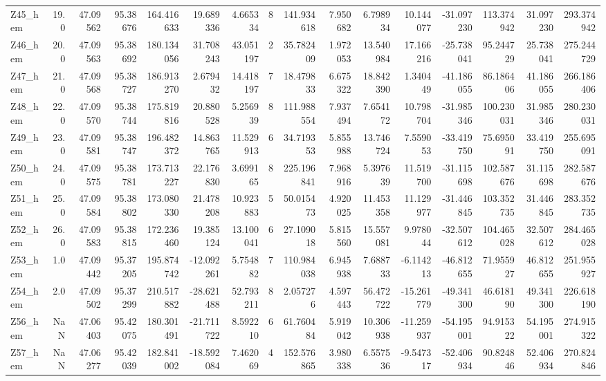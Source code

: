 \documentclass[11pt]{article}
\begin{document}
\begin{sidewaystable}
{\begin{tabular}{lrrrrrrrrrrrrrrr}
Z45\_hem &       19.0 &  47.09562 &  95.38676 &  164.416633 &  19.689336 &   4.665334 &  8 &  141.934618 &  7.950682 &   6.798934 &      10.144077 & -31.097230 &  113.374942 &    31.097230 &   293.374942 \\
Z46\_hem &       20.0 &  47.09563 &  95.38692 &  180.134056 &  31.708243 &  43.051197 &  2 &   35.782409 &  1.972053 &  13.540984 &      17.166216 & -25.738041 &   95.244729 &    25.738041 &   275.244729 \\
Z47\_hem &       21.0 &  47.09568 &  95.38727 &  186.913270 &   2.679432 &  14.418197 &  7 &   18.479833 &  6.675322 &  18.842390 &       1.340449 & -41.186055 &   86.186406 &    41.186055 &   266.186406 \\
Z48\_hem &       22.0 &  47.09570 &  95.38744 &  175.819816 &  20.880528 &   5.256939 &  8 &  111.988554 &  7.937494 &   7.654172 &      10.798704 & -31.985346 &  100.230031 &    31.985346 &   280.230031 \\
Z49\_hem &       23.0 &  47.09581 &  95.38747 &  196.482372 &  14.863765 &  11.529913 &  6 &   34.719353 &  5.855988 &  13.746724 &       7.559053 & -33.419750 &   75.695091 &    33.419750 &   255.695091 \\
Z50\_hem &       24.0 &  47.09575 &  95.38781 &  173.713227 &  22.176830 &   3.699165 &  8 &  225.196841 &  7.968916 &   5.397639 &      11.519700 & -31.115698 &  102.587676 &    31.115698 &   282.587676 \\
Z51\_hem &       25.0 &  47.09584 &  95.38802 &  173.080330 &  21.478208 &  10.923883 &  5 &   50.015473 &  4.920025 &  11.453358 &      11.129977 & -31.446845 &  103.352735 &    31.446845 &   283.352735 \\
Z52\_hem &       26.0 &  47.09583 &  95.38815 &  172.236460 &  19.385124 &  13.100041 &  6 &   27.109018 &  5.815560 &  15.557081 &       9.978044 & -32.507612 &  104.465028 &    32.507612 &   284.465028 \\
Z53\_hem &        1.0 &  47.09442 &  95.37205 &  195.874742 & -12.092261 &   5.754882 &  7 &  110.984038 &  6.945938 &   7.688733 &      -6.114213 & -46.812655 &   71.955927 &    46.812655 &   251.955927 \\
Z54\_hem &        2.0 &  47.09502 &  95.37299 &  210.517882 & -28.621488 &  52.793211 &  8 &    2.057276 &  4.597443 &  56.472722 &     -15.261779 & -49.341300 &   46.618190 &    49.341300 &   226.618190 \\
Z56\_hem &        NaN &  47.06403 &  95.42075 &  180.301491 & -21.711722 &   8.592210 &  6 &   61.760484 &  5.919042 &  10.306938 &     -11.259937 & -54.195001 &   94.915322 &    54.195001 &   274.915322 \\
Z57\_hem &        NaN &  47.06277 &  95.42039 &  182.841002 & -18.592084 &   7.462069 &  4 &  152.576865 &  3.980338 &   6.557536 &      -9.547317 & -52.406934 &   90.824846 &    52.406934 &   270.824846 \\
\bottomrule
\end{tabular}}
\end{sidewaystable}
    
\end{document}
